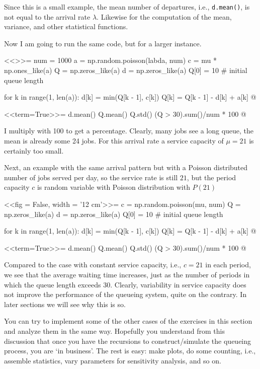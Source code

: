\begin{question}
\begin{solution}
Since this is a small example, the mean number of departures, i.e.,
\texttt{d.mean()}, is not equal to the arrival rate $\lambda$.  
Likewise for the computation of the mean, variance, and other
statistical functions. 

Now I am going to run the same code, but for a larger instance. 

<<>>=
num = 1000
a = np.random.poisson(labda, num)
c = mu * np.ones_like(a)
Q = np.zeros_like(a)
d = np.zeros_like(a)
Q[0] = 10  # initial queue length

for k in range(1, len(a)):
    d[k] = min(Q[k - 1], c[k])
    Q[k] = Q[k - 1] - d[k] + a[k]
@

<<term=True>>=
d.mean()
Q.mean()
Q.std()
(Q > 30).sum()/num * 100
@


I multiply with 100 to get a percentage. Clearly, many jobs see a long
queue, the mean is already some 24 jobs. For this arrival rate a
service capacity of $\mu=21$ is certainly too small. 

Next, an example with the same arrival pattern but with a Poisson
distributed number of jobs served per day, so the service rate is
still $21$, but the period capacity $c$ is random variable with
Poisson distribution with $P(21)$

<<fig = False, width = '12 cm'>>=
c = np.random.poisson(mu, num)
Q = np.zeros_like(a)
d = np.zeros_like(a)
Q[0] = 10  # initial queue length

for k in range(1, len(a)):
    d[k] = min(Q[k - 1], c[k])
    Q[k] = Q[k - 1] - d[k] + a[k]
@

<<term=True>>=
d.mean()
Q.mean()
Q.std()
(Q > 30).sum()/num * 100
@

Compared to the case with constant service capacity, i.e., $c=21$ in
each period, we see that the average waiting time increases, just as
the number of periods in which the queue length exceeds 30. Clearly,
variability in service capacity does not improve the performance of
the queueing system, quite on the contrary. In later sections we will
see why this is so.

You can try to implement some of the other cases of the exercises in
this section and analyze them in the same way. Hopefully you
understand from this discussion that once you have the recursions to
construct/simulate the queueing process, you are `in business'. The
rest is easy: make plots, do some counting, i.e., assemble statistics,
vary parameters for sensitivity analysis, and so on.

  \end{solution}
\end{question}


